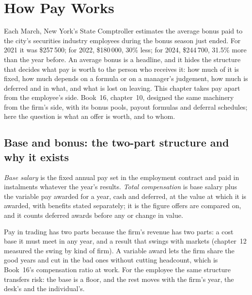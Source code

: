 \chapter{How Pay Works}\label{ch:in:how-pay-works}

Each March, New York's State Comptroller estimates the average bonus paid to the city's securities industry employees
during the bonus season just ended. For 2021 it was \$257\,500; for 2022, \$180\,000, 30\% less; for 2024, \$244\,700,
31.5\% more than the year before. An average bonus is a headline, and it hides the structure that decides what pay is
worth to the person who receives it: how much of it is fixed, how much depends on a formula or on a manager's judgement,
how much is deferred and in what, and what is lost on leaving. This chapter takes pay apart from the employee's side.
Book~16, chapter~10, designed the same machinery from the firm's side, with its bonus pools, payout formulas and
deferral schedules; here the question is what an offer is worth, and to whom.

\section{Base and bonus: the two-part structure and why it exists}

\begin{definition}\label{def:in:how-pay-works:base}
\emph{Base salary} is the fixed annual pay set in the employment contract and paid in instalments
whatever the year's results. \emph{Total compensation} is base salary plus the variable pay
awarded for a year, cash and deferred, at the value at which it is awarded, with benefits stated separately; it is the
figure offers are compared on, and it counts deferred awards before any  or change in value.
\end{definition}

Pay in trading has two parts because the firm's revenue has two parts: a cost base it must meet in any year, and a
result that swings with markets (chapter~12 measured the swing by kind of firm). A variable award lets the firm share the
good years and cut in the bad ones without cutting headcount, which is Book~16's compensation ratio at work. For the
employee the same structure transfers risk: the base is a floor, and the rest moves with the firm's year, the desk's
and the individual's.

